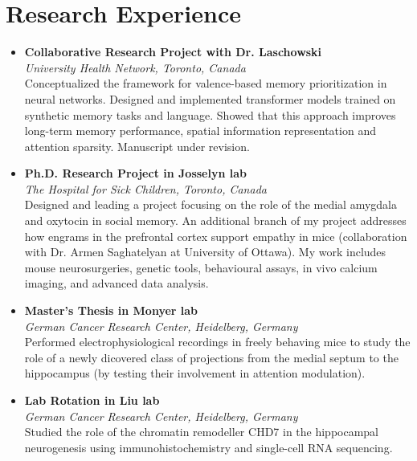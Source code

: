 \documentclass[12pt]{article}
\begin{document}
\section*{Research Experience}
\begin{itemize}
    \item[\textbf{08/2025 -- ongoing}] \textbf{Collaborative Research Project with Dr. Laschowski} \\
    \textit{University Health Network, Toronto, Canada} \\
    Conceptualized the framework for valence-based memory prioritization in neural networks. Designed and implemented transformer models trained on synthetic memory tasks and language. Showed that this approach improves long-term memory performance, spatial information representation and attention sparsity. Manuscript under revision.

    \item[\textbf{09/2023 -- ongoing}] \textbf{Ph.D. Research Project in Josselyn lab} \\
    \textit{The Hospital for Sick Children, Toronto, Canada} \\
    Designed and leading a project focusing on the role of the medial amygdala and oxytocin in social memory. An additional branch of my project addresses how engrams in the prefrontal cortex support empathy in mice (collaboration with Dr. Armen Saghatelyan at University of Ottawa). My work includes mouse neurosurgeries, genetic tools, behavioural assays, in vivo calcium imaging, and advanced data analysis.

    \item[\textbf{03/2023 -- 09/2023}] \textbf{Master's Thesis in Monyer lab} \\
    \textit{German Cancer Research Center, Heidelberg, Germany} \\
    Performed electrophysiological recordings in freely behaving mice to study the role of a newly dicovered class of projections from the medial septum to the hippocampus (by testing their involvement in attention modulation).

    \item[\textbf{12/2022 -- 02/2023}] \textbf{Lab Rotation in Liu lab} \\
    \textit{German Cancer Research Center, Heidelberg, Germany} \\
    Studied the role of the chromatin remodeller CHD7 in the hippocampal neurogenesis
    using immunohistochemistry and single-cell RNA sequencing.


\end{itemize}
\end{document}
